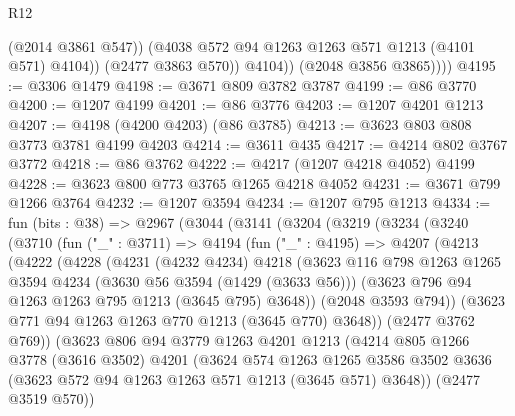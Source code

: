 \begin{lexlean}{R12}
\begin{coremodule}
                    (@2014 @3861 @547))
                  (@4038 @572 @94 @1263 @1263 @571 @1213 (@4101 @571) @4104))
                (@2477 @3863 @570))
              @4104))
          (@2048 @3856 @3865))))
@4195 := @3306 @1479
@4198 := @3671 @809 @3782 @3787
@4199 := @86 @3770
@4200 := @1207 @4199
@4201 := @86 @3776
@4203 := @1207 @4201 @1213
@4207 := @4198 (@4200 @4203) (@86 @3785)
@4213 := @3623 @803 @808 @3773 @3781 @4199 @4203
@4214 := @3611 @435
@4217 := @4214 @802 @3767 @3772
@4218 := @86 @3762
@4222 := @4217 (@1207 @4218 @4052) @4199
@4228 := @3623 @800 @773 @3765 @1265 @4218 @4052
@4231 := @3671 @799 @1266 @3764
@4232 := @1207 @3594
@4234 := @1207 @795 @1213
@4334 := fun (bits : @38) =>
  @2967
    (@3044
      (@3141
        (@3204
          (@3219
            (@3234
              (@3240
                (@3710
                  (fun ("_" : @3711) =>
                  @4194
                    (fun ("_" : @4195) =>
                    @4207
                      (@4213
                        (@4222
                          (@4228
                            (@4231
                              (@4232 @4234)
                              @4218
                              (@3623
                                @116
                                @798
                                @1263
                                @1265
                                @3594
                                @4234
                                (@3630 @56 @3594 (@1429 (@3633 @56)))
                                (@3623 @796 @94 @1263 @1263 @795 @1213 (@3645 @795) @3648))
                              (@2048 @3593 @794))
                            (@3623 @771 @94 @1263 @1263 @770 @1213 (@3645 @770) @3648))
                          (@2477 @3762 @769))
                        (@3623
                          @806
                          @94
                          @3779
                          @1263
                          @4201
                          @1213
                          (@4214
                            @805
                            @1266
                            @3778
                            (@3616 @3502)
                            @4201
                            (@3624
                              @574
                              @1263
                              @1265
                              @3586
                              @3502
                              @3636
                              (@3623 @572 @94 @1263 @1263 @571 @1213 (@3645 @571) @3648))
                            (@2477 @3519 @570))

\end{coremodule}
\end{lexlean}
